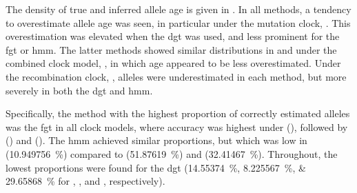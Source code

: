 %

%

The density of true and inferred allele age is given in .
In all  methods, a tendency to overestimate allele age was seen, in particular under the mutation clock, \ClockM.
This overestimation was elevated when the \gls{dgt} was used, and less prominent for the \gls{fgt} or \gls{hmm}.
The latter methods showed similar distributions in \ClockM and under the combined clock model, \ClockC, in which age appeared to be less overestimated.
Under the recombination clock, \ClockR, alleles were underestimated in each method, but more severely in both the \gls{dgt} and \gls{hmm}.

Specifically, the method with the highest proportion of correctly estimated alleles was the \gls{fgt} in all  clock models, where accuracy was highest under \ClockR (), followed by \ClockC () and \ClockM ().
The \gls{hmm} achieved similar proportions, but which was low in \ClockR (\SI{10.949756}{\percent}) compared to \ClockC (\SI{51.87619}{\percent}) and \ClockM (\SI{32.41467}{\percent}).
Throughout, the lowest proportions were found for the \gls{dgt} (\SIlist{14.55374;8.225567;29.65868}{\percent} for \ClockM, \ClockR, and \ClockC, respectively).

%

%

